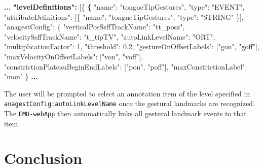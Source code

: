 \documentclass[]{book}
\newenvironment{Shaded}{\begin{snugshade}}{\end{snugshade}}
\newcommand{\DataTypeTok}[1]{\textcolor[rgb]{0.13,0.29,0.53}{#1}}
\newcommand{\DecValTok}[1]{\textcolor[rgb]{0.00,0.00,0.81}{#1}}
\newcommand{\ErrorTok}[1]{\textcolor[rgb]{0.64,0.00,0.00}{\textbf{#1}}}
\newcommand{\FloatTok}[1]{\textcolor[rgb]{0.00,0.00,0.81}{#1}}
\newcommand{\FunctionTok}[1]{\textcolor[rgb]{0.00,0.00,0.00}{#1}}
\newcommand{\OtherTok}[1]{\textcolor[rgb]{0.56,0.35,0.01}{#1}}
\newcommand{\StringTok}[1]{\textcolor[rgb]{0.31,0.60,0.02}{#1}}
\begin{document}
\begin{Shaded}
\begin{Highlighting}[]
\ErrorTok{...}
\ErrorTok{"levelDefinitions":} \OtherTok{[}\FunctionTok{\{}
  \ErrorTok{\{}
    \DataTypeTok{"name"}\FunctionTok{:} \StringTok{"tongueTipGestures"}\FunctionTok{,}
    \DataTypeTok{"type"}\FunctionTok{:} \StringTok{"EVENT"}\FunctionTok{,}
    \DataTypeTok{"attributeDefinitions"}\FunctionTok{:} \OtherTok{[}\FunctionTok{\{}
        \DataTypeTok{"name"}\FunctionTok{:} \StringTok{"tongueTipGestures"}\FunctionTok{,}
        \DataTypeTok{"type"}\FunctionTok{:} \StringTok{"STRING"}
    \FunctionTok{\}}\OtherTok{]}\FunctionTok{,}
    \DataTypeTok{"anagestConfig"}\FunctionTok{:} \FunctionTok{\{}
        \DataTypeTok{"verticalPosSsffTrackName"}\FunctionTok{:} \StringTok{"tt_posz"}\FunctionTok{,}
        \DataTypeTok{"velocitySsffTrackName"}\FunctionTok{:} \StringTok{"t_tipTV"}\FunctionTok{,}
        \DataTypeTok{"autoLinkLevelName"}\FunctionTok{:} \StringTok{"ORT"}\FunctionTok{,}
        \DataTypeTok{"multiplicationFactor"}\FunctionTok{:} \DecValTok{1}\FunctionTok{,}
        \DataTypeTok{"threshold"}\FunctionTok{:} \FloatTok{0.2}\FunctionTok{,}
        \DataTypeTok{"gestureOnOffsetLabels"}\FunctionTok{:} \OtherTok{[}\StringTok{"gon"}\OtherTok{,} \StringTok{"goff"}\OtherTok{]}\FunctionTok{,}
        \DataTypeTok{"maxVelocityOnOffsetLabels"}\FunctionTok{:} \OtherTok{[}\StringTok{"von"}\OtherTok{,} \StringTok{"voff"}\OtherTok{]}\FunctionTok{,}
        \DataTypeTok{"constrictionPlateauBeginEndLabels"}\FunctionTok{:} \OtherTok{[}\StringTok{"pon"}\OtherTok{,} \StringTok{"poff"}\OtherTok{]}\FunctionTok{,}
        \DataTypeTok{"maxConstrictionLabel"}\FunctionTok{:} \StringTok{"mon"}
    \FunctionTok{\}}
\ErrorTok{...}
\end{Highlighting}
\end{Shaded}

The user will be prompted to select an annotation item of the level specified in \texttt{anagestConfig:autoLinkLevelName} once the gestural landmarks are recognized. The \texttt{EMU-webApp} then automatically links all gestural landmark events to that item.

\hypertarget{conclusion-5}{%
\section{Conclusion}\label{conclusion-5}}
\end{document}
